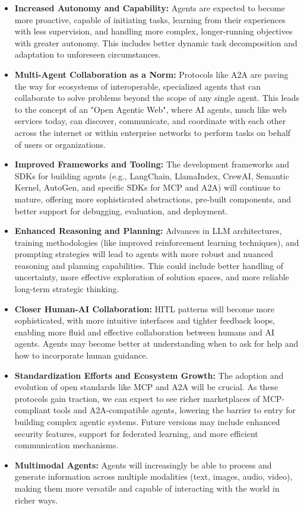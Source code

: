 \begin{itemize}
    \item \textbf{Increased Autonomy and Capability:} Agents are expected to become more proactive, capable of initiating tasks, 
    learning from their experiences with less supervision, and handling more complex, longer-running objectives with greater autonomy. 
    This includes better dynamic task decomposition and adaptation to unforeseen circumstances.
    \item \textbf{Multi-Agent Collaboration as a Norm:} Protocols like A2A are paving the way for ecosystems of interoperable, specialized agents 
    that can collaborate to solve problems beyond the scope of any single agent. This leads to the concept of an "Open Agentic Web", where AI agents, 
    much like web services today, can discover, communicate, and coordinate with each other across the internet or within enterprise networks to perform 
    tasks on behalf of users or organizations.
    \item \textbf{Improved Frameworks and Tooling:} The development frameworks and SDKs for building agents (e.g., LangChain, LlamaIndex, CrewAI, 
    Semantic Kernel, AutoGen, and specific SDKs for MCP and A2A) will continue to mature, offering more sophisticated abstractions, pre-built components, 
    and better support for debugging, evaluation, and deployment.
    \item \textbf{Enhanced Reasoning and Planning:} Advances in LLM architectures, training methodologies (like improved reinforcement learning techniques),
     and prompting strategies will lead to agents with more robust and nuanced reasoning and planning capabilities. This could include better handling of 
     uncertainty, more effective exploration of solution spaces, and more reliable long-term strategic thinking.
    \item \textbf{Closer Human-AI Collaboration:} HITL patterns will become more sophisticated, with more intuitive interfaces and tighter feedback loops,
     enabling more fluid and effective collaboration between humans and AI agents. Agents may become better at understanding when to ask for help and how 
     to incorporate human guidance.
    \item \textbf{Standardization Efforts and Ecosystem Growth:} The adoption and evolution of open standards like MCP and A2A will be crucial. As these 
    protocols gain traction, we can expect to see richer marketplaces of MCP-compliant tools and A2A-compatible agents, lowering the barrier to entry for 
    building complex agentic systems. Future versions may include enhanced security features, support for federated learning, and more efficient communication mechanisms.
    \item \textbf{Multimodal Agents:} Agents will increasingly be able to process and generate information across multiple modalities (text, images, audio, video), 
    making them more versatile and capable of interacting with the world in richer ways.
\end{itemize}

